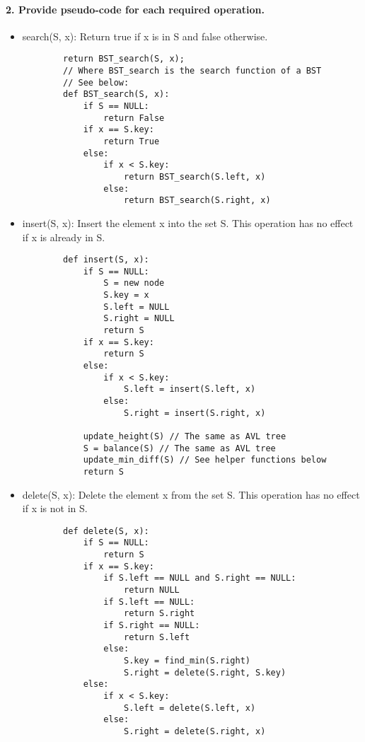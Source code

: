 \documentclass{article}
\begin{document}
\paragraph*{2. Provide pseudo-code for each required operation.}
\begin{itemize}
    \item search(S, x): Return true if x is in S and false otherwise.
          \begin{lstlisting}
        return BST_search(S, x);
        // Where BST_search is the search function of a BST
        // See below:
        def BST_search(S, x):
            if S == NULL:
                return False
            if x == S.key:
                return True
            else:
                if x < S.key:
                    return BST_search(S.left, x)
                else:
                    return BST_search(S.right, x)
    \end{lstlisting}

          \newpage

    \item insert(S, x): Insert the element x into the set S.
          This operation has no effect if x is already in S.
          \begin{lstlisting}
        def insert(S, x):
            if S == NULL:
                S = new node
                S.key = x
                S.left = NULL
                S.right = NULL
                return S
            if x == S.key:
                return S
            else:
                if x < S.key:
                    S.left = insert(S.left, x)
                else:
                    S.right = insert(S.right, x)
            
            update_height(S) // The same as AVL tree
            S = balance(S) // The same as AVL tree
            update_min_diff(S) // See helper functions below
            return S
    \end{lstlisting}

          \newpage

    \item delete(S, x): Delete the element x from the set S.
          This operation has no effect if x is not in S.
          \begin{lstlisting}
        def delete(S, x):
            if S == NULL:
                return S
            if x == S.key:
                if S.left == NULL and S.right == NULL:
                    return NULL
                if S.left == NULL:
                    return S.right
                if S.right == NULL:
                    return S.left
                else:
                    S.key = find_min(S.right)
                    S.right = delete(S.right, S.key)
            else:
                if x < S.key:
                    S.left = delete(S.left, x)
                else:
                    S.right = delete(S.right, x)
            

\end{lstlisting}
\end{itemize}
\end{document}
